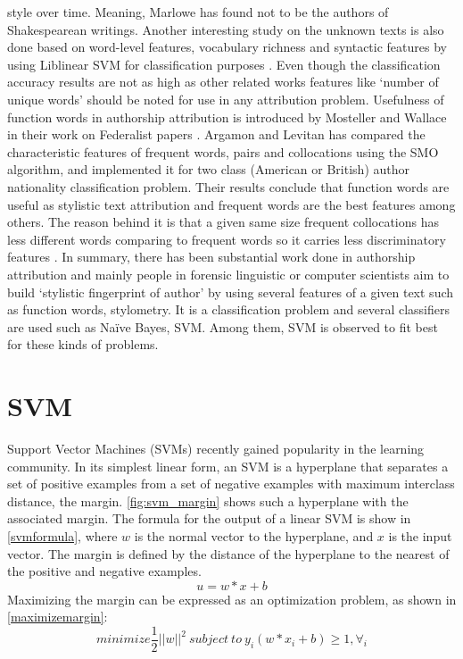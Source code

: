 style over time. Meaning, Marlowe has found not to be the authors of Shakespearean
writings.
Another interesting study on the unknown texts is also
done based on word-level features, vocabulary richness and syntactic features by using
Liblinear SVM for classification purposes \cite{stanko2013whose}. Even though the classification accuracy
results are not as high as other related works features like \enquote*{number of unique words}
should be noted for use in any attribution problem.
Usefulness of function words in authorship attribution is introduced by Mosteller
and Wallace in their work on Federalist papers \cite{mosteller2007inference}. Argamon and Levitan has compared the characteristic features of frequent words, pairs and collocations using the
SMO algorithm, and implemented it for two class (American or British) author nationality classification problem. Their results conclude that function words are useful
as stylistic text attribution and frequent words are the best features among others.
The reason behind it is that a given same size frequent collocations has less different
words comparing to frequent words so it carries less discriminatory features \cite{argamon2005measuring}.
In summary, there has been substantial work done in authorship attribution and
mainly people in forensic linguistic or computer scientists aim to build \enquote*{stylistic fingerprint of author} by using several features of a given text such as function words,
stylometry. It is a classification problem and several classifiers are used such as Na\"ive
Bayes, SVM. Among them, SVM is observed to fit best for these kinds of problems.

\section{SVM}
Support Vector Machines (SVMs) recently gained popularity in the learning community\cite{vapnik1999overview}. In its simplest
linear form, an SVM is a hyperplane that separates
a set of positive examples from a set of negative examples with maximum interclass distance, the margin.
\autoref{fig:svm_margin} shows such a hyperplane with the associated
margin.
The formula for the output of a linear SVM is show in \autoref{svmformula}, where $w$ is the normal vector to the hyperplane, and $x$ is the input vector. The margin is defined by the distance of the hyperplane to the nearest of the positive
and negative examples.
\begin{equation}\label{svmformula}
	u = w * x + b
\end{equation}
Maximizing the margin can be
expressed as an optimization problem, as shown in  \autoref{maximizemargin}:
\begin{equation}\label{maximizemargin}
	minimize\frac{1}{2}||w||^2\ subject\ to\ y_i(w*x_i+b)\geq 1, \forall_i
\end{equation}


